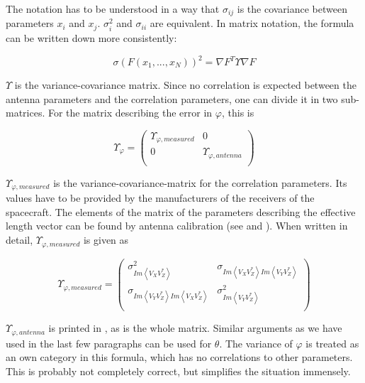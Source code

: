 \documentclass[a4paper,14pt]{extbook}
\begin{document}
The notation has to be understood in a way that $\sigma_{ij}$ is the covariance between parameters $x_i$ and $x_j$. $\sigma_i^2$ and $\sigma_{ii}$ are equivalent. In matrix notation, the formula can be written down more consistently:

\begin{equation}\label{error_prop_multi_variant_matrix}
\sigma (F(x_1,...,x_N))^2= \nabla F^T \Upsilon \nabla F
\end{equation}

$\Upsilon$ is the variance-covariance matrix. Since no correlation is expected between the antenna parameters and the correlation parameters, one can divide it in two sub-matrices. For the matrix describing the error in $\varphi$, this is

\begin{equation}\label{var-covar-matr_phi_simpli2}
\Upsilon_\varphi=\left(%
\begin{array}{cc}
 \Upsilon_{\varphi,measured} & 0 \\
0 & \Upsilon_{\varphi,antenna} \\
\end{array}%
\right)
\end{equation}

$\Upsilon_{\varphi,measured}$ is the variance-covariance-matrix for the correlation parameters. Its values have to be provided by the manufacturers of the receivers of the spacecraft. The elements of the matrix of the parameters describing the effective length vector can be found by antenna calibration (see \cite{antenna_report_1} and \cite{antenna_report_2}). When written in detail, $\Upsilon_{\varphi,measured}$ is given as

\begin{equation}\label{var-covar-matr_measured}
\Upsilon_{\varphi,measured}=\left(%
\begin{array}{cc}
  \sigma_{Im \left\langle V_X V_Z^{*}\right \rangle}^2 & \sigma_{Im \left\langle V_X V_Z^{*}\right\rangle Im \left\langle V_Y V_Z^{*}\right\rangle} \\
 \sigma_{Im \left\langle V_Y V_Z^{*}\right\rangle Im \left\langle V_X V_Z^{*}\right\rangle} & \sigma_{Im \left\langle V_Y V_Z^{*}\right\rangle}^2 \\
\end{array}
\right)
\end{equation}

$\Upsilon_{\varphi,antenna}$ is printed in \cite{DF}, as is the whole matrix. Similar arguments as we have used in the last few paragraphs can be used for $\theta$. The variance of $\varphi$ is treated as an own category in this formula, which has no correlations to other parameters. This is probably not completely correct, but simplifies the situation immensely.
\end{document}
